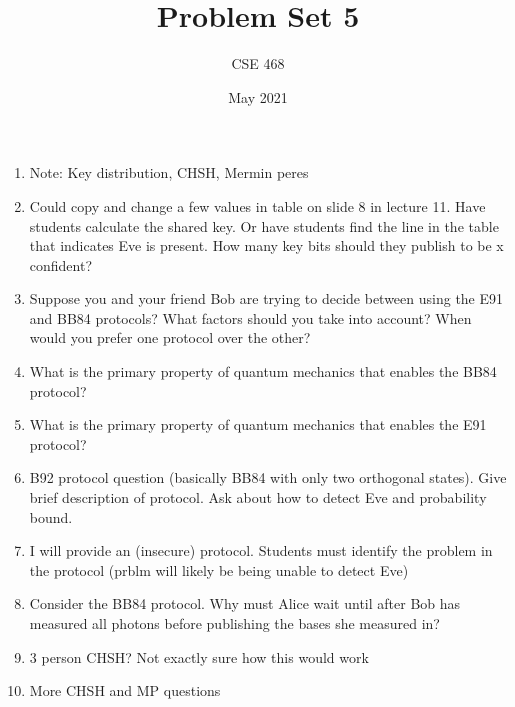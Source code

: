\documentclass[12pt]{article}
\title{Problem Set 5}
\author{CSE 468}
\date{May 2021}
\begin{document}
\maketitle



\begin{enumerate}[font=\bfseries]
    \item Note: Key distribution, CHSH, Mermin peres
    \item Could copy and change a few values in table on slide 8 in lecture 11. Have students calculate the shared key. Or have students find the line in the table that indicates Eve is present. How many key bits should they publish to be x confident?
    \item Suppose you and your friend Bob are trying to decide between using the E91 and BB84 protocols? What factors should you take into account? When would you prefer one protocol over the other?
    \item What is the primary property of quantum mechanics that enables the BB84 protocol?
    \item What is the primary property of quantum mechanics that enables the E91 protocol?
    \item B92 protocol question (basically BB84 with only two orthogonal states). Give brief description of protocol. Ask about how to detect Eve and probability bound.
    \item I will provide an (insecure) protocol. Students must identify the problem in the protocol (prblm will likely be being unable to detect Eve)
    \item Consider the BB84 protocol. Why must Alice wait until after Bob has measured all photons before publishing the bases she measured in?
    \item 3 person CHSH? Not exactly sure how this would work
    \item More CHSH and MP questions
\end{enumerate}
\end{document}
